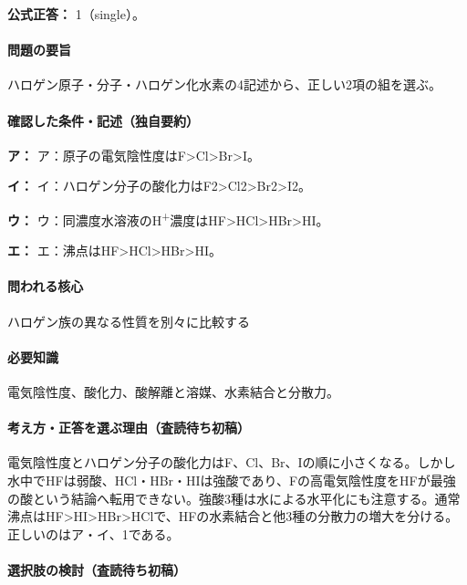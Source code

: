 \textbf{公式正答：} 1（single）。

\paragraph{問題の要旨} ハロゲン原子・分子・ハロゲン化水素の4記述から、正しい2項の組を選ぶ。

\paragraph{確認した条件・記述（独自要約）}\mbox{}\par

\noindent\textbf{ア：} ア：原子の電気陰性度はF>Cl>Br>I。\par

\noindent\textbf{イ：} イ：ハロゲン分子の酸化力はF2>Cl2>Br2>I2。\par

\noindent\textbf{ウ：} ウ：同濃度水溶液のH\textsuperscript{+}濃度はHF>HCl>HBr>HI。\par

\noindent\textbf{エ：} エ：沸点はHF>HCl>HBr>HI。\par

\paragraph{問われる核心} ハロゲン族の異なる性質を別々に比較する

\paragraph{必要知識} 電気陰性度、酸化力、酸解離と溶媒、水素結合と分散力。

\paragraph{考え方・正答を選ぶ理由（査読待ち初稿）} 電気陰性度とハロゲン分子の酸化力はF、Cl、Br、Iの順に小さくなる。しかし水中でHFは弱酸、HCl・HBr・HIは強酸であり、Fの高電気陰性度をHFが最強の酸という結論へ転用できない。強酸3種は水による水平化にも注意する。通常沸点はHF>HI>HBr>HClで、HFの水素結合と他3種の分散力の増大を分ける。正しいのはア・イ、1である。

\paragraph{選択肢の検討（査読待ち初稿）}\mbox{}\par

